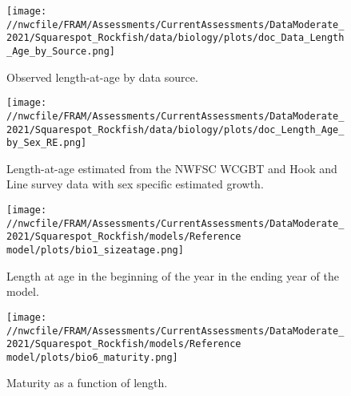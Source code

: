 \documentclass[11pt,
  english,
  a4paper,
]{article}
\begin{document}

\begin{figure}
\centering
\texttt{[image: //nwcfile/FRAM/Assessments/CurrentAssessments/DataModerate\_2021/Squarespot\_Rockfish/data/biology/plots/doc\_Data\_Length\_Age\_by\_Source.png]}
\caption{Observed length-at-age by data source.\label{fig:len-age-data}}
\end{figure}

\tagmcend\tagstructend


\begin{figure}
\centering
\texttt{[image: //nwcfile/FRAM/Assessments/CurrentAssessments/DataModerate\_2021/Squarespot\_Rockfish/data/biology/plots/doc\_Length\_Age\_by\_Sex\_RE.png]}
\caption{Length-at-age estimated from the NWFSC WCGBT and Hook and Line survey data with sex specific estimated growth.\label{fig:len-age}}
\end{figure}

\tagmcend\tagstructend


\begin{figure}
\centering
\texttt{[image: //nwcfile/FRAM/Assessments/CurrentAssessments/DataModerate\_2021/Squarespot\_Rockfish/models/Reference model/plots/bio1\_sizeatage.png]}
\caption{Length at age in the beginning of the year in the ending year of the model.\label{fig:len-age-ss}}
\end{figure}

\tagmcend\tagstructend


\begin{figure}
\centering
\texttt{[image: //nwcfile/FRAM/Assessments/CurrentAssessments/DataModerate\_2021/Squarespot\_Rockfish/models/Reference model/plots/bio6\_maturity.png]}
\caption{Maturity as a function of length.\label{fig:maturity}}
\end{figure}
\end{document}
